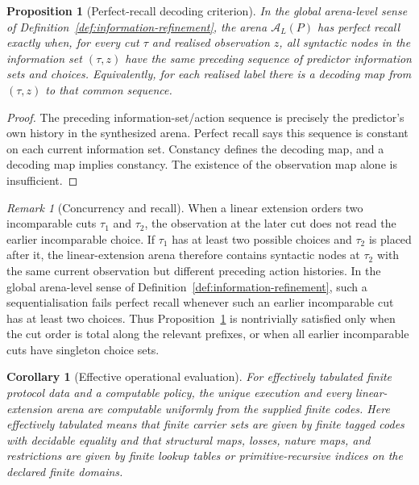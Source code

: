 \documentclass[11pt]{article}
\theoremstyle{plain}
\newtheorem{proposition}[theorem]{Proposition}
\newtheorem{corollary}[theorem]{Corollary}
\theoremstyle{definition}
\theoremstyle{remark}
\newtheorem{remark}[theorem]{Remark}
\begin{document}
\begin{proposition}[Perfect-recall decoding criterion]
\label{prop:operational-perfect-recall}
In the global arena-level sense of Definition~\ref{def:information-refinement},
the arena $\mathcal A_L(P)$ has perfect recall exactly when, for every cut
$\tau$ and realised observation $z$, all syntactic nodes in the information set
$(\tau,z)$ have the same preceding sequence of predictor information sets and
choices. Equivalently, for each realised label there is a decoding map from
$(\tau,z)$ to that common sequence.
\end{proposition}

\begin{proof}
The preceding information-set/action sequence is precisely the predictor's own
history in the synthesized arena. Perfect recall says this sequence is constant
on each current information set. Constancy defines the decoding map, and a
decoding map implies constancy. The existence of the observation map alone is
insufficient.
\end{proof}

\begin{remark}[Concurrency and recall]
When a linear extension orders two incomparable cuts $\tau_1$ and $\tau_2$, the
observation at the later cut does not read the earlier incomparable choice. If
$\tau_1$ has at least two possible choices and $\tau_2$ is placed after it, the
linear-extension arena therefore contains syntactic nodes at $\tau_2$ with the
same current observation but different preceding action histories. In the global
arena-level sense of Definition~\ref{def:information-refinement}, such a
sequentialisation fails perfect recall whenever such an earlier incomparable cut
has at least two choices. Thus Proposition~\ref{prop:operational-perfect-recall}
is nontrivially satisfied only when the cut order is total along the relevant
prefixes, or when all earlier incomparable cuts have singleton choice sets.
\end{remark}

\begin{corollary}[Effective operational evaluation]
\label{cor:effective-operational}
For effectively tabulated finite protocol data and a computable policy, the
unique execution and every linear-extension arena are computable uniformly from
the supplied finite codes. Here effectively tabulated means that finite carrier
sets are given by finite tagged codes with decidable equality and that structural
maps, losses, nature maps, and restrictions are given by finite lookup tables or
primitive-recursive indices on the declared finite domains.
\end{corollary}
\end{document}
